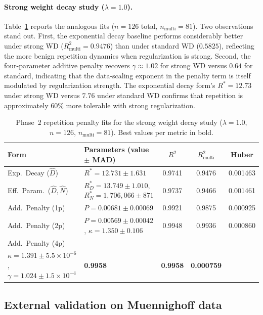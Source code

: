 \paragraph{Strong weight decay study ($\lambda = 1.0$).}
Table~\ref{tab:phase2_strongwd} reports the analogous fits ($n = 126$ total, $n_{\text{multi}} = 81$).
Two observations stand out.
First, the exponential decay baseline performs considerably better under strong WD ($R^2_{\text{multi}} = 0.9476$) than under standard WD ($0.5825$), reflecting the more benign repetition dynamics when regularization is strong.
Second, the four-parameter additive penalty recovers $\gamma \approx 1.02$ for strong WD versus $0.64$ for standard, indicating that the data-scaling exponent in the penalty term is itself modulated by regularization strength.
The exponential decay form's $R^* = 12.73$ under strong WD versus $7.76$ under standard WD confirms that repetition is approximately 60\% more tolerable with strong regularization.

\begin{table}[t]
\centering
\caption{Phase~2 repetition penalty fits for the strong weight decay study ($\lambda = 1.0$, $n = 126$, $n_{\text{multi}} = 81$). Best values per metric in bold.}
\label{tab:phase2_strongwd}
\small
\begin{tabular}{llccc}
\toprule
Form & Parameters (value $\pm$ MAD) & $R^2$ & $R^2_{\text{multi}}$ & Huber \\
\midrule
Exp.\ Decay ($\widehat{D}$) & $R^* = 12.731 \pm 1.631$ & 0.9741 & 0.9476 & 0.001463 \\
Eff.\ Param.\ ($\widehat{D}, \widehat{N}$) & $R^*_D = 13.749 \pm 1.010$, $R^*_N = 1{,}706{,}066 \pm 871$ & 0.9737 & 0.9466 & 0.001461 \\
\midrule
Add.\ Penalty (1p) & $P = 0.00681 \pm 0.00069$ & 0.9921 & 0.9875 & 0.000925 \\
Add.\ Penalty (2p) & $P = 0.00569 \pm 0.00042$, $\kappa = 1.350 \pm 0.106$ & 0.9948 & 0.9936 & 0.000860 \\
Add.\ Penalty (4p) & \makecell[l]{$P = 0.00257 \pm 1.45 \times 10^{-8}$, $\delta = 1.563 \pm 1.4 \times 10^{-5}$, \\ $\kappa = 1.391 \pm 5.5 \times 10^{-6}$, $\gamma = 1.024 \pm 1.5 \times 10^{-4}$} & \textbf{0.9958} & \textbf{0.9958} & \textbf{0.000759} \\
\bottomrule
\end{tabular}
\end{table}

\subsection{External validation on Muennighoff data}


